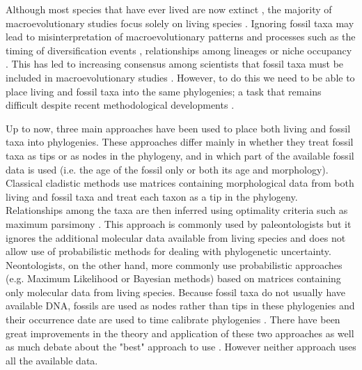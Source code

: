 \documentclass[12pt,letterpaper]{article}
\begin{document}
Although most species that have ever lived are now extinct \citep{novacek1992ext,raup1993extinction}, the majority of macroevolutionary studies focus solely on living species \citep[e.g.][]{meredithimpacts2011,jetzthe2012}. Ignoring fossil taxa may lead to misinterpretation of macroevolutionary patterns and processes such as the timing of diversification events \citep[e.g.][]{pyrondivergence2011}, relationships among lineages \citep[e.g.][]{manosphylogeny2007} or niche occupancy \citep[e.g.][]{pearmanniche2008}. This has led to increasing consensus among scientists that fossil taxa must be included in macroevolutionary studies \citep{jacksonwhat2006,quentaldiversity2010,dietlconservation2011,slaterunifying2013,fritzdiversity2013}. However, to do this we need to be able to place living and fossil taxa into the same phylogenies; a task that remains difficult despite recent methodological developments \citep[e.g.][]{pyrondivergence2011,ronquista2012,schragocombining2013}. %

Up to now, three main approaches have been used to place both living and fossil taxa into phylogenies. These approaches differ mainly in whether they treat fossil taxa as tips or as nodes in the phylogeny, and in which part of the available fossil data is used (i.e. the age of the fossil only or both its age and morphology). Classical cladistic methods use matrices containing morphological data from both living and fossil taxa and treat each taxon as a tip in the phylogeny. Relationships among the taxa are then inferred using optimality criteria such as maximum parsimony \citep{simpson1945}. This approach is commonly used by paleontologists but it ignores the additional molecular data available from living species and does not allow use of probabilistic methods for dealing with phylogenetic uncertainty. Neontologists, on the other hand, more commonly use probabilistic approaches (e.g. Maximum Likelihood or Bayesian methods) based on matrices containing only molecular data from living species. Because fossil taxa do not usually have available DNA, fossils are used as nodes rather than tips in these phylogenies and their occurrence date are used to time calibrate phylogenies \citep{zuckerkandl1965}. There have been great improvements in the theory and application of these two approaches \citep[e.g.][]{bapsta2013,stadlerdating2013,heaththe2013} as well as much debate about the "best" approach to use \citep[e.g.][]{spencerefficacy2013,wrightbayesian2014}. However neither approach uses all the available data.
\end{document}
